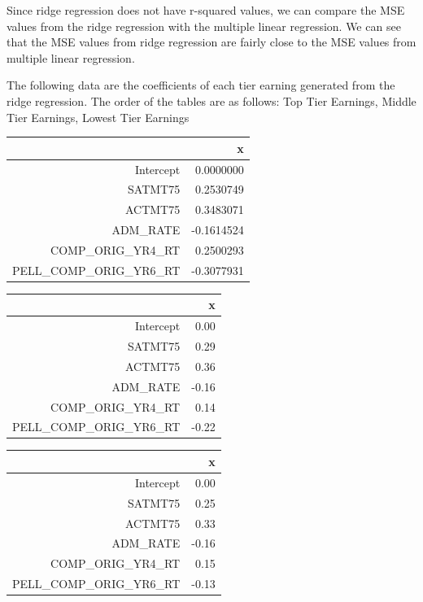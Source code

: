 \documentclass{article}
\begin{document}
  Since ridge regression does not have r-squared values, we can compare the MSE values from the ridge regression with the multiple linear regression.  We can see that the MSE values from ridge regression are fairly close to the MSE values from multiple linear regression. 

  The following data are the coefficients of each tier earning generated from the ridge regression.  The order of the tables are as follows: Top Tier Earnings, Middle Tier Earnings, Lowest Tier Earnings \newline
\begin{table}[ht]
\centering
\begin{tabular}{rr}
  \hline
 & x \\ 
  \hline
Intercept & 0.0000000 \\ 
  SATMT75 & 0.2530749 \\ 
  ACTMT75 & 0.3483071 \\ 
  ADM\_RATE & -0.1614524 \\ 
  COMP\_ORIG\_YR4\_RT & 0.2500293 \\ 
  PELL\_COMP\_ORIG\_YR6\_RT & -0.3077931 \\ 
   \hline
\end{tabular}
\end{table}%
\begin{table}[ht]
\centering
\begin{tabular}{rr}
  \hline
 & x \\ 
  \hline
Intercept & 0.00 \\ 
  SATMT75 & 0.29 \\ 
  ACTMT75 & 0.36 \\ 
  ADM\_RATE & -0.16 \\ 
  COMP\_ORIG\_YR4\_RT & 0.14 \\ 
  PELL\_COMP\_ORIG\_YR6\_RT & -0.22 \\ 
   \hline
\end{tabular}
\end{table}%
\begin{table}[ht]
\centering
\begin{tabular}{rr}
  \hline
 & x \\ 
  \hline
Intercept & 0.00 \\ 
  SATMT75 & 0.25 \\ 
  ACTMT75 & 0.33 \\ 
  ADM\_RATE & -0.16 \\ 
  COMP\_ORIG\_YR4\_RT & 0.15 \\ 
  PELL\_COMP\_ORIG\_YR6\_RT & -0.13 \\ 
   \hline
\end{tabular}
\end{table}\newline
\end{document}
